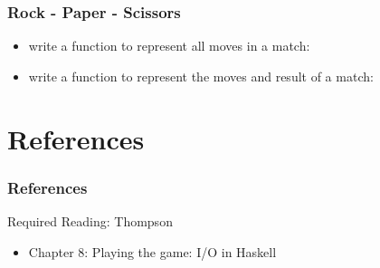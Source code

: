 \documentclass[dvipsnames]{beamer}
\theoremstyle{plain}
\begin{document}
\begin{frame}
  \frametitle{Rock - Paper - Scissors}

  \begin{itemize}
    \item write a function to represent all moves in a match:\\
      \smallskip
    \item write a function to represent the moves and result of a match:\\
      \smallskip
  \end{itemize}
\end{frame}

\section*{References}

\begin{frame}
  \frametitle{References}

  \begin{block}{Required Reading: Thompson}
    \begin{itemize}
      \item Chapter 8: \alert{Playing the game: I/O in Haskell}
    \end{itemize}
  \end{block}
\end{frame}
\end{document}
